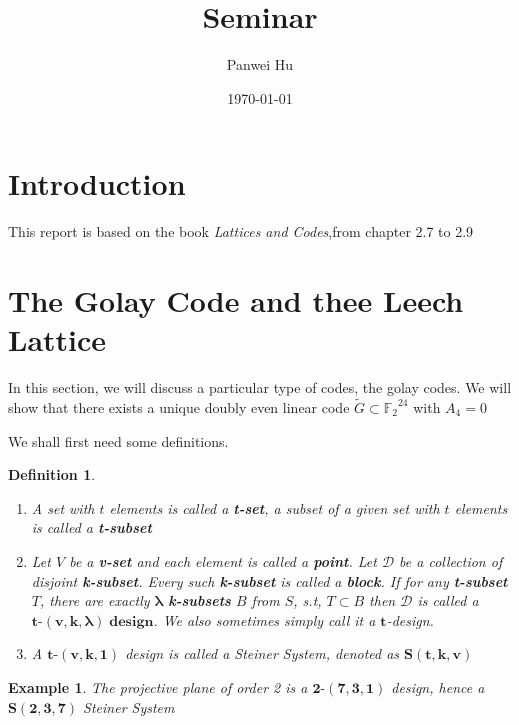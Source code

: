 \documentclass{article}
\title{Seminar}
\date{\today}
\author{Panwei Hu}
\newtheorem{definition}{Definition}
\newtheorem{example}{Example}
\newcommand{\GExtend}{\ensuremath{\widetilde{G}}}
\newcommand{\Ftwo}{\ensuremath{\mathbb{F}_2}}
\newcommand{\tCompleteDesign}{\ensuremath{\bm{t\mbox{-}(v,k,\lambda)\; design}}}
\begin{document}
  \maketitle
  \newpage

\tableofcontents
	\newpage
  \newpage
\newpage
\section{Introduction}

This report is based on the book \emph{Lattices and Codes},from chapter 2.7 to 2.9
\newpage
\section{The Golay Code and thee Leech Lattice}
In this section, we will discuss a particular type of codes, the golay codes. We will show that there exists a unique doubly even linear code  $\GExtend \subset \Ftwo^{24}$ with $A_4 = 0$ 

We shall first need some definitions.
\begin{definition}
	\begin{enumerate}
		\item A set with $t$ elements is called a \textbf{t-set}, a subset of a given set with $t$ elements is called a \textbf{t-subset}
		\item Let $V$ be a \textbf{v-set} and each element is called a \textbf{point}. Let $\mathscr{D}$ be a collection of disjoint \textbf{k-subset}. Every such \textbf{k-subset} is called a \textbf{block}. If for any \textbf{t-subset} $T$, there are exactly $\mathbf{\lambda}$ \textbf{k-subsets} $B$ from $S$, s.t, $T \subset B$ then $\mathscr{D}$ is called a \tCompleteDesign . We also sometimes simply call it a $\bm{t}$-design.
		\item A $\bm{t\mbox{-}(v,k,1)}$ design is called a \emph{Steiner System}, denoted as $\bm{S(t,k,v)}$
	\end{enumerate}
\end{definition}
\begin{example}\label{projPlane}
		The projective plane of order 2 is a $\bm{2\mbox{-}(7,3,1)}$ design, hence a $\bm{S(2,3,7)}$ \emph{Steiner System}
\end{example}
\end{document}
